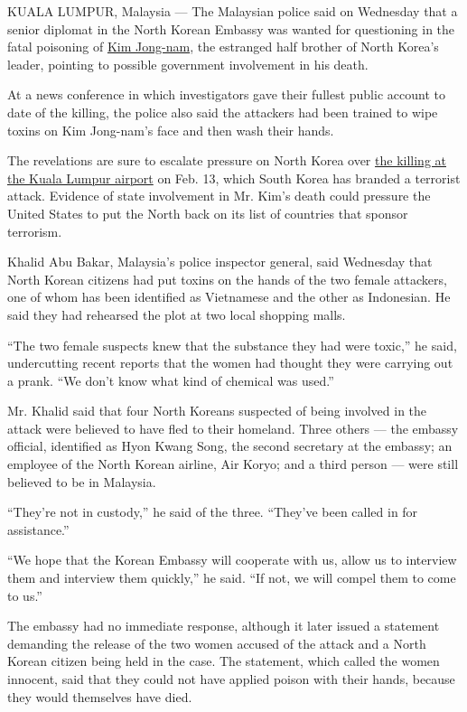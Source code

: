 KUALA LUMPUR, Malaysia --- The Malaysian police said on Wednesday that a
senior diplomat in the North Korean Embassy was wanted for questioning
in the fatal poisoning of
\href{https://www.nytimes.com/2017/02/15/world/asia/kim-jong-nam-assassination-north-korea.html}{Kim
Jong-nam}, the estranged half brother of North Korea's leader, pointing
to possible government involvement in his death.

At a news conference in which investigators gave their fullest public
account to date of the killing, the police also said the attackers had
been trained to wipe toxins on Kim Jong-nam's face and then wash their
hands.

The revelations are sure to escalate pressure on North Korea over
\href{https://www.nytimes.com/2017/02/14/world/asia/kim-jong-un-brother-killed-malaysia.html}{the
killing at the Kuala Lumpur airport} on Feb. 13, which South Korea has
branded a terrorist attack. Evidence of state involvement in Mr. Kim's
death could pressure the United States to put the North back on its list
of countries that sponsor terrorism.

Khalid Abu Bakar, Malaysia's police inspector general, said Wednesday
that North Korean citizens had put toxins on the hands of the two female
attackers, one of whom has been identified as Vietnamese and the other
as Indonesian. He said they had rehearsed the plot at two local shopping
malls.

``The two female suspects knew that the substance they had were toxic,''
he said, undercutting recent reports that the women had thought they
were carrying out a prank. ``We don't know what kind of chemical was
used.''

Mr. Khalid said that four North Koreans suspected of being involved in
the attack were believed to have fled to their homeland. Three others
--- the embassy official, identified as Hyon Kwang Song, the second
secretary at the embassy; an employee of the North Korean airline, Air
Koryo; and a third person --- were still believed to be in Malaysia.

``They're not in custody,'' he said of the three. ``They've been called
in for assistance.''

``We hope that the Korean Embassy will cooperate with us, allow us to
interview them and interview them quickly,'' he said. ``If not, we will
compel them to come to us.''

The embassy had no immediate response, although it later issued a
statement demanding the release of the two women accused of the attack
and a North Korean citizen being held in the case. The statement, which
called the women innocent, said that they could not have applied poison
with their hands, because they would themselves have died.

